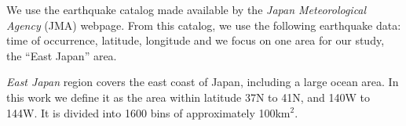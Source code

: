 
We use the earthquake catalog made available by the \emph{Japan
  Meteorological Agency} (JMA) webpage. From this catalog, we use the
following earthquake data: time of occurrence, latitude,
longitude and  we focus on one area for our study, the ``East Japan'' area.


\emph{East Japan} region covers the east coast of Japan, including a
large ocean area. In this work we define it as the area within
latitude 37N to 41N, and 140W to 144W. It is divided into 1600 bins of
approximately 100km$^2$.




%
%
